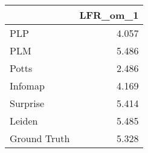 \begin{tabular}{lr}
\toprule
{} & LFR_om_1 \\
\midrule
PLP          &    4.057 \\
PLM          &    5.486 \\
Potts        &    2.486 \\
Infomap      &    4.169 \\
Surprise     &    5.414 \\
Leiden       &    5.485 \\
Ground Truth &    5.328 \\
\bottomrule
\end{tabular}
